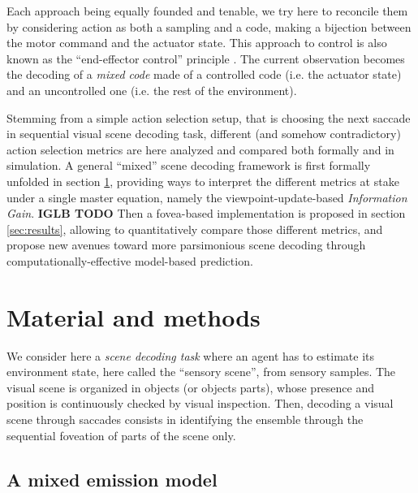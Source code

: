 \documentclass[12pt,twoside,openright]{article}
\begin{document}
{\color{Purple} Each approach being equally founded and tenable, we try here} to reconcile them by considering action as both a sampling and a code, making a bijection between the motor command and the actuator state. This approach to control is also known as the ``end-effector control'' principle \citep{mussa2004neural}. The current observation becomes the decoding of a \emph{mixed code}  
made of a controlled code (i.e. the actuator state) and an uncontrolled one (i.e. the rest of the environment). 

{\color{Purple} Stemming from a simple action selection setup, that is choosing the next saccade in sequential visual scene decoding task, different (and somehow contradictory) action selection metrics are here analyzed and compared both formally and in simulation.  
A general ``mixed'' scene decoding framework is first formally unfolded in section \ref{sec:material}}, providing ways to interpret the different metrics at stake under a single master equation, namely the viewpoint-update-based \emph{Information Gain}. 
{\color{magenta} \bf IGLB TODO}
Then a fovea-based implementation is proposed in section \ref{sec:results}, allowing to quantitatively compare those different metrics, and propose new avenues toward more parsimonious scene decoding through computationally-effective model-based prediction.

\section{Material and methods} \label{sec:material}

We consider here a \emph{scene decoding task} where an agent has to estimate its environment state, here called the ``sensory scene'', from sensory samples. The visual scene is organized in objects (or objects parts), whose presence and position is continuously checked by visual inspection. 
Then, decoding a visual scene through saccades consists in identifying the ensemble through the sequential foveation of parts of the scene only. 

\subsection{A mixed emission model}\label{sec:three-party}
\end{document}
